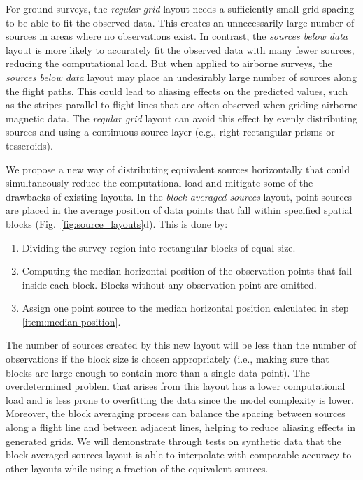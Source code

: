 For ground surveys, the \emph{regular grid} layout needs a sufficiently
small grid spacing to be able to fit the observed data.
This creates an unnecessarily large number of sources in areas where no
observations exist.
In contrast, the \emph{sources below data} layout is more likely to accurately
fit the observed data with many fewer sources, reducing the computational load.
But when applied to airborne surveys, the \emph{sources below data} layout may
place an undesirably large number of sources along the flight paths.
This could lead to aliasing effects on the predicted values, such as the
stripes parallel to flight lines that are often observed when griding airborne
magnetic data.
The \emph{regular grid} layout can avoid this effect by evenly
distributing sources and using a continuous source layer (e.g.,
right-rectangular prisms or tesseroids).

We propose a new way of distributing equivalent sources horizontally that could
simultaneously reduce the computational load and mitigate some of the drawbacks
of existing layouts.
In the \emph{block-averaged sources} layout,
point sources are placed in the average
position of data points that fall within specified spatial blocks
(Fig.~\ref{fig:source_layouts}d).
This is done by:

\begin{enumerate}
    \item Dividing the survey region into rectangular blocks of equal size.
    \item \label{item:median-position} Computing the median horizontal position
        of the observation points that fall inside each block. Blocks without
        any observation point are omitted.
    \item Assign one point source to the median horizontal position calculated
        in step \ref{item:median-position}.
\end{enumerate}

The number of sources created by this new layout will be less than the number
of observations if the block size is chosen appropriately (i.e., making sure
that blocks are large enough to contain more than a single data point).
The overdetermined problem that arises from this layout has a lower
computational load and is less prone to overfitting the data since the model
complexity is lower.
Moreover, the block averaging process can balance the spacing between sources
along a flight line and between adjacent lines, helping to reduce aliasing
effects in generated grids.
We will demonstrate through tests on synthetic data that the block-averaged sources
layout is able to interpolate with comparable accuracy to other layouts while
using a fraction of the equivalent sources.


